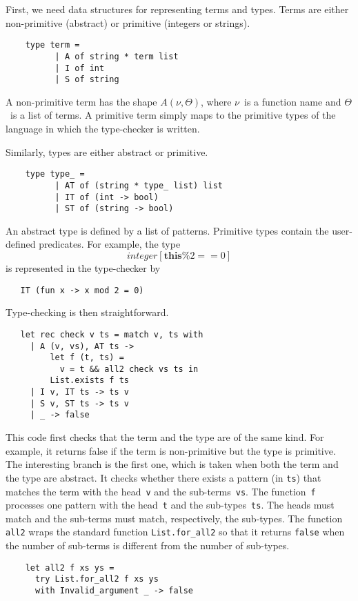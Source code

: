 \documentclass[a4paper,12pt,oneside,fleqn]{book} %
\begin{document}
First, we need data structures for representing terms and types. Terms are
either non-primitive (abstract) or primitive (integers or strings).
\begin{verbatim}
    type term =
          | A of string * term list
          | I of int
          | S of string
\end{verbatim}
A non-primitive term has the shape $A(\nu,\Theta)$, where $\nu$~is a
function name and $\Theta$~is a list of terms. A primitive term simply maps
to the primitive types of the language in which the type-checker is
written.

Similarly, types are either abstract or primitive.
\begin{verbatim}
    type type_ =
          | AT of (string * type_ list) list
          | IT of (int -> bool)
          | ST of (string -> bool)
\end{verbatim}
An abstract type is defined by a list of patterns. Primitive types contain the
user-defined predicates. For example, the type
\[\mathit{integer}[\mathbf{this}\%2==0]\] is represented in the type-checker by
\begin{verbatim}
   IT (fun x -> x mod 2 = 0)
\end{verbatim}

Type-checking is then straightforward.
\begin{verbatim}
   let rec check v ts = match v, ts with
     | A (v, vs), AT ts ->
         let f (t, ts) =
           v = t && all2 check vs ts in
         List.exists f ts
     | I v, IT ts -> ts v
     | S v, ST ts -> ts v
     | _ -> false
\end{verbatim}
This code first checks that the term and the type are of the same kind. For
example, it returns false if the term is non-primitive but the type is
primitive. The interesting branch is the first one, which is taken when
both the term and the type are abstract. It checks whether there exists a
pattern (in \verb|ts|) that matches the term with the head~\verb|v| and the
sub-terms~\verb|vs|. The function~\verb|f| processes one pattern with the
head~\verb|t| and the sub-types~\verb|ts|. The heads must match and the
sub-terms must match, respectively, the sub-types. The function \verb|all2|
wraps the standard function \verb|List.for_all2| so that it returns
\verb|false| when the number of sub-terms is different from the number of
sub-types.
\begin{verbatim}
    let all2 f xs ys =
      try List.for_all2 f xs ys
      with Invalid_argument _ -> false
\end{verbatim}
\end{document}
